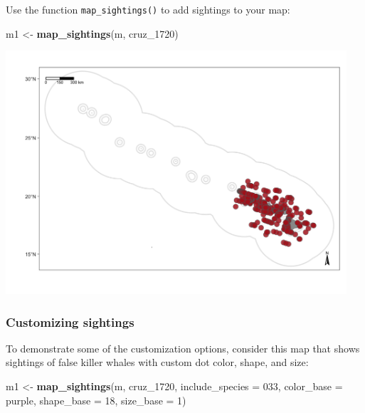\documentclass[
]{book}
\newenvironment{Shaded}{\begin{snugshade}}{\end{snugshade}}
\newcommand{\AttributeTok}[1]{\textcolor[rgb]{0.13,0.29,0.53}{#1}}
\newcommand{\DecValTok}[1]{\textcolor[rgb]{0.00,0.00,0.81}{#1}}
\newcommand{\FunctionTok}[1]{\textcolor[rgb]{0.13,0.29,0.53}{\textbf{#1}}}
\newcommand{\NormalTok}[1]{#1}
\newcommand{\OtherTok}[1]{\textcolor[rgb]{0.56,0.35,0.01}{#1}}
\newcommand{\StringTok}[1]{\textcolor[rgb]{0.31,0.60,0.02}{#1}}
\begin{document}
Use the function \texttt{map\_sightings()} to add sightings to your map:

\begin{Shaded}
\begin{Highlighting}[]
\NormalTok{m1 }\OtherTok{\textless{}{-}} \FunctionTok{map\_sightings}\NormalTok{(m, cruz\_1720)}
\end{Highlighting}
\end{Shaded}

\includegraphics[width=0.95\textwidth,height=\textheight]{img/map_sits.png}

\hypertarget{customizing-sightings}{%
\subsubsection*{Customizing sightings}\label{customizing-sightings}}

To demonstrate some of the customization options, consider this map that shows sightings of false killer whales with custom dot color, shape, and size:

\begin{Shaded}
\begin{Highlighting}[]
\NormalTok{m1 }\OtherTok{\textless{}{-}} \FunctionTok{map\_sightings}\NormalTok{(m,}
\NormalTok{                    cruz\_1720,}
                    \AttributeTok{include\_species =} \StringTok{\textquotesingle{}033\textquotesingle{}}\NormalTok{,}
                    \AttributeTok{color\_base =} \StringTok{\textquotesingle{}purple\textquotesingle{}}\NormalTok{,}
                    \AttributeTok{shape\_base =} \DecValTok{18}\NormalTok{,}
                    \AttributeTok{size\_base =} \DecValTok{1}\NormalTok{)}
\end{Highlighting}
\end{Shaded}
\end{document}

